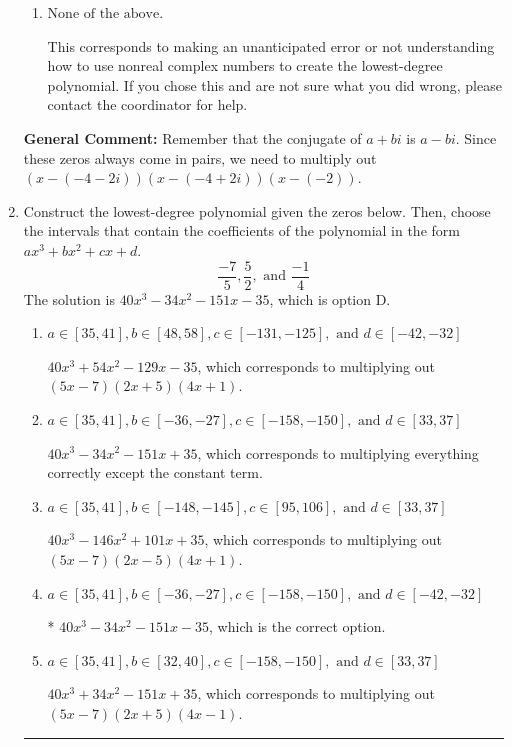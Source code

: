 \documentclass{extbook}[14pt]
\newcommand{\litem}[1]{\item #1

\rule{\textwidth}{0.4pt}}
\begin{document}
\begin{enumerate}
{\begin{enumerate}[label=\Alph*.]
$x^{3} -10 x^{2} +36 x -40$, which corresponds to multiplying out $(x-(-4 - 2 i))(x-(-4 + 2 i))(x -2)$.
\item \( \text{None of the above.} \)

This corresponds to making an unanticipated error or not understanding how to use nonreal complex numbers to create the lowest-degree polynomial. If you chose this and are not sure what you did wrong, please contact the coordinator for help.
\end{enumerate}

\textbf{General Comment:} Remember that the conjugate of $a+bi$ is $a-bi$. Since these zeros always come in pairs, we need to multiply out $(x-(-4 - 2 i))(x-(-4 + 2 i))(x-(-2))$.
}
\litem{
Construct the lowest-degree polynomial given the zeros below. Then, choose the intervals that contain the coefficients of the polynomial in the form $ax^3+bx^2+cx+d$.
\[ \frac{-7}{5}, \frac{5}{2}, \text{ and } \frac{-1}{4} \]The solution is \( 40x^{3} -34 x^{2} -151 x -35 \), which is option D.\begin{enumerate}[label=\Alph*.]
\item \( a \in [35, 41], b \in [48, 58], c \in [-131, -125], \text{ and } d \in [-42, -32] \)

$40x^{3} +54 x^{2} -129 x -35$, which corresponds to multiplying out $(5x -7)(2x + 5)(4x + 1)$.
\item \( a \in [35, 41], b \in [-36, -27], c \in [-158, -150], \text{ and } d \in [33, 37] \)

$40x^{3} -34 x^{2} -151 x + 35$, which corresponds to multiplying everything correctly except the constant term.
\item \( a \in [35, 41], b \in [-148, -145], c \in [95, 106], \text{ and } d \in [33, 37] \)

$40x^{3} -146 x^{2} +101 x + 35$, which corresponds to multiplying out $(5x -7)(2x -5)(4x + 1)$.
\item \( a \in [35, 41], b \in [-36, -27], c \in [-158, -150], \text{ and } d \in [-42, -32] \)

* $40x^{3} -34 x^{2} -151 x -35$, which is the correct option.
\item \( a \in [35, 41], b \in [32, 40], c \in [-158, -150], \text{ and } d \in [33, 37] \)

$40x^{3} +34 x^{2} -151 x + 35$, which corresponds to multiplying out $(5x -7)(2x + 5)(4x -1)$.
\end{enumerate}

}
\end{enumerate}
\end{document}
